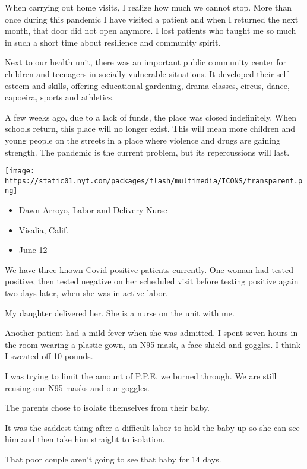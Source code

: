 When carrying out home visits, I realize how much we cannot stop. More
than once during this pandemic I have visited a patient and when I
returned the next month, that door did not open anymore. I lost patients
who taught me so much in such a short time about resilience and
community spirit.

Next to our health unit, there was an important public community center
for children and teenagers in socially vulnerable situations. It
developed their self-esteem and skills, offering educational gardening,
drama classes, circus, dance, capoeira, sports and athletics.

A few weeks ago, due to a lack of funds, the place was closed
indefinitely. When schools return, this place will no longer exist. This
will mean more children and young people on the streets in a place where
violence and drugs are gaining strength. The pandemic is the current
problem, but its repercussions will last.

\texttt{[image: https://static01.nyt.com/packages/flash/multimedia/ICONS/transparent.png]}

\begin{itemize}
\tightlist
\item
  Dawn Arroyo, Labor and Delivery Nurse
\item
  Visalia, Calif.
\item
  June 12
\end{itemize}

We have three known Covid-positive patients currently. One woman had
tested positive, then tested negative on her scheduled visit before
testing positive again two days later, when she was in active labor.

My daughter delivered her. She is a nurse on the unit with me.

Another patient had a mild fever when she was admitted. I spent seven
hours in the room wearing a plastic gown, an N95 mask, a face shield and
goggles. I think I sweated off 10 pounds.

I was trying to limit the amount of P.P.E. we burned through. We are
still reusing our N95 masks and our goggles.

The parents chose to isolate themselves from their baby.

It was the saddest thing after a difficult labor to hold the baby up so
she can see him and then take him straight to isolation.

That poor couple aren't going to see that baby for 14 days.


